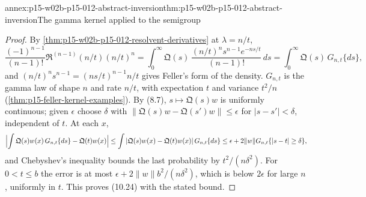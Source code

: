 \begin{annexitem}{annex:p15-w02b-p15-012-abstract-inversion}{thm:p15-w02b-p15-012-abstract-inversion}{The gamma kernel applied to the semigroup}
\begin{proof}
By \cref{thm:p15-w02b-p15-012-resolvent-derivatives} at \(\lambda=n/t\),
\[
 \frac{(-1)^{n-1}}{(n-1)!}\mathfrak R^{(n-1)}(n/t)(n/t)^n
   =\int_0^\infty\mathfrak Q(s)\,\frac{(n/t)^ns^{n-1}e^{-ns/t}}{(n-1)!}\,ds
   =\int_0^\infty\mathfrak Q(s)\,G_{n,t}\{ds\},
\]
and \((n/t)^ns^{n-1}=(ns/t)^{n-1}n/t\) gives Feller's form of the density.
\(G_{n,t}\) is the gamma law of shape \(n\) and rate \(n/t\), with expectation
\(t\) and variance \(t^2/n\) (\cref{thm:p15-feller-kernel-examples}).
By (8.7), \(s\mapsto\mathfrak Q(s)w\) is uniformly continuous; given
\(\epsilon\) choose \(\delta\) with \(\|\mathfrak Q(s)w-\mathfrak Q(s')w\|\leq\epsilon\)
for \(|s-s'|<\delta\), independent of \(t\). At each \(x\),
\[
 \Bigl|\int\mathfrak Q(s)w(x)\,G_{n,t}\{ds\}-\mathfrak Q(t)w(x)\Bigr|
   \leq\int|\mathfrak Q(s)w(x)-\mathfrak Q(t)w(x)|\,G_{n,t}\{ds\}
   \leq\epsilon+2\|w\|G_{n,t}\{|s-t|\geq\delta\},
\]
and Chebyshev's inequality bounds the last probability by
\(t^2/(n\delta^2)\). For \(0<t\leq b\) the error is at most
\(\epsilon+2\|w\|b^2/(n\delta^2)\), which is below \(2\epsilon\) for large
\(n\), uniformly in \(t\). This proves (10.24) with the stated bound.
\end{proof}
\end{annexitem}

